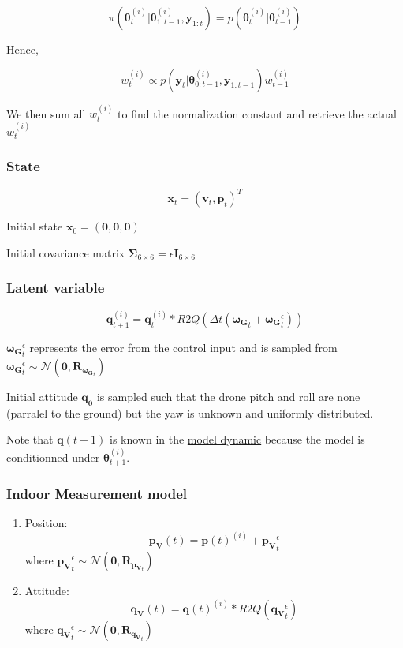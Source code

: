 \documentclass[12pt,]{article}
\providecommand{\tightlist}{%
  \setlength{\itemsep}{0pt}\setlength{\parskip}{0pt}}
\begin{document}
\[\pi(\boldsymbol{\theta}^{(i)}_t | \boldsymbol{\theta}^{(i)}_{1:t-1}, \mathbf{y}_{1:t}) = p(\boldsymbol{\theta}^{(i)}_t | \boldsymbol{\theta}^{(i)}_{t-1}) \]

Hence,

\[w^{(i)}_t \propto p(\mathbf{y}_t | \boldsymbol{\theta}^{(i)}_{0:t-1}, \mathbf{y}_{1:t-1}) w^{(i)}_{t-1}\]

We then sum all \(w^{(i)}_t\) to find the normalization constant and
retrieve the actual \(w^{(i)}_t\)

\subsubsection{State}\label{state-4}

\[\mathbf{x}_t = (\mathbf{v}_t, \mathbf{p}_t)^T\]

Initial state \(\mathbf{x}_0 = (\mathbf{0}, \mathbf{0}, \mathbf{0})\)

Initial covariance matrix
\(\mathbf{\Sigma}_{6 \times 6} = \epsilon \mathbf{I}_{6 \times 6}\)

\subsubsection{Latent variable}\label{latent-variable}

\[\mathbf{q}^{(i)}_{t+1} = \mathbf{q}^{(i)}_t*R2Q({\Delta t} (\mathbf{\boldsymbol{\omega}_G}_t+\mathbf{\boldsymbol{\omega}_G}^\epsilon_t))\]

\(\mathbf{\boldsymbol{\omega}_G}^\epsilon_t\) represents the error from
the control input and is sampled from
\(\mathbf{\boldsymbol{\omega}_G}^\epsilon_t \sim \mathcal{N}(\mathbf{0}, \mathbf{R}_{\mathbf{\boldsymbol{\omega}_G}_t })\)

Initial attitude \(\mathbf{q_0}\) is sampled such that the drone pitch
and roll are none (parralel to the ground) but the yaw is unknown and
uniformly distributed.

Note that \(\mathbf{q}(t+1)\) is known in the
\protect\hyperlink{model-dynamic}{model dynamic} because the model is
conditionned under \(\boldsymbol{\theta}^{(i)}_{t+1}\).

\subsubsection{Indoor Measurement model}\label{indoor-measurement-model}

\begin{enumerate}
\def\labelenumi{\arabic{enumi}.}
\tightlist
\item
  Position:
  \[\mathbf{p_V}(t) = \mathbf{p}(t)^{(i)} + \mathbf{p_V}^\epsilon_t\]
  where
  \(\mathbf{p_V}^\epsilon_t \sim \mathcal{N}(\mathbf{0}, \mathbf{R}_{\mathbf{p_V}_t })\)
\item
  Attitude:
  \[\mathbf{q_V}(t) = \mathbf{q}(t)^{(i)}*R2Q(\mathbf{q_V}^\epsilon_t)\]
  where
  \(\mathbf{q_V}^\epsilon_t \sim \mathcal{N}(\mathbf{0}, \mathbf{R}_{\mathbf{q_V}_t })\)
\end{enumerate}
\end{document}
